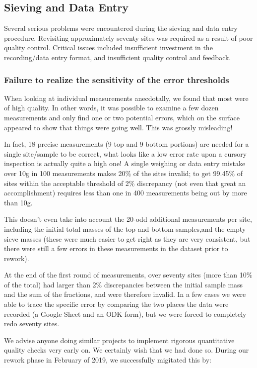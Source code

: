 \documentclass[a4paper,12pt]{article}
\begin{document}
\subsection{Sieving and Data Entry}

Several serious problems were encountered during the sieving and data entry procedure. Revisiting approximately seventy sites was required as a result of poor quality control. Critical issues included insufficient investment in the recording/data entry format, and insufficient quality control and feedback.

\subsubsection{Failure to realize the sensitivity of the error thresholds}
When looking at individual measurements anecdotally, we found that most were of high quality. In other words, it was possible to examine a few dozen measurements and only find one or two potential errors, which on the surface appeared to show that things were going well. This was grossly misleading!

In fact, 18 precise measurements (9 top and 9 bottom portions) are needed for a single site/sample to be correct, what looks like a low error rate upon a cursory inspection is actually quite a high one! A single weighing or data entry mistake over 10g in 100 measurements makes 20\% of the sites invalid; to get 99.45\% of sites within the acceptable threshold of 2\% discrepancy (not even that great an accomplishment) requires less than one in 400 measurements being out by more than 10g. 

This doesn't even take into account the 20-odd additional measurements per site, including the initial total masses of the top and bottom samples,and the empty sieve masses (these were much easier to get right as they are very consistent, but there were still a few errors in these measurements in the dataset prior to rework).

At the end of the first round of measurements, over seventy sites (more than 10\% of the total) had larger than 2\% discrepancies between the initial sample mass and the sum of the fractions, and were therefore invalid. In a few cases we were able to trace the specific error by comparing the two places the data were recorded (a Google Sheet and an ODK form), but we were forced to completely redo seventy sites.

We advise anyone doing similar projects to implement rigorous quantitative quality checks very early on. We certainly wish that we had done so. During our rework phase in February of 2019, we successfully migitated this by:
\end{document}
